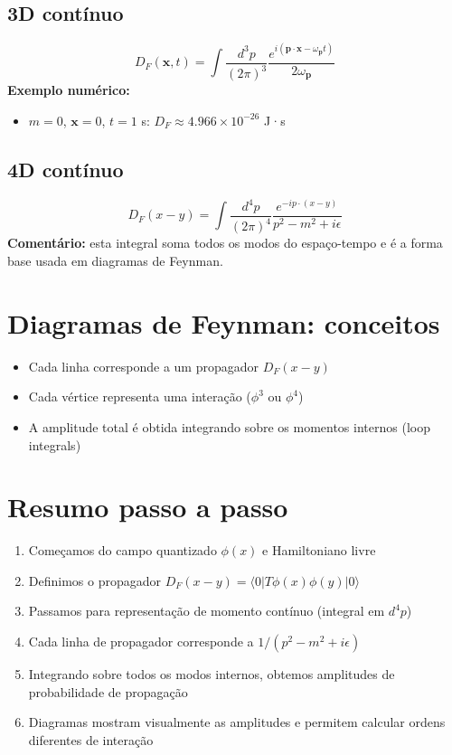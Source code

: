 \documentclass[12pt,a4paper]{article}
\begin{document}
\subsection{3D contínuo}
\begin{equation}
D_F(\mathbf{x},t) = \int \frac{d^3p}{(2\pi)^3} \frac{e^{i(\mathbf{p}\cdot\mathbf{x}-\omega_\mathbf{p} t)}}{2\omega_\mathbf{p}}
\end{equation}
\textbf{Exemplo numérico:}
\begin{itemize}
\item $m=0$, $\mathbf{x}=0$, $t=1$ s: $D_F \approx 4.966\times10^{-26}$ J·s
\end{itemize}

\subsection{4D contínuo}
\begin{equation}
D_F(x-y) = \int \frac{d^4p}{(2\pi)^4} \frac{e^{-i p\cdot (x-y)}}{p^2 - m^2 + i\epsilon}
\end{equation}
\textbf{Comentário:} esta integral soma todos os modos do espaço-tempo e é a forma base usada em diagramas de Feynman.

\section{Diagramas de Feynman: conceitos}
\begin{itemize}
\item Cada linha corresponde a um propagador $D_F(x-y)$
\item Cada vértice representa uma interação ($\phi^3$ ou $\phi^4$)
\item A amplitude total é obtida integrando sobre os momentos internos (loop integrals)
\end{itemize}

\section{Resumo passo a passo}
\begin{enumerate}
\item Começamos do campo quantizado $\phi(x)$ e Hamiltoniano livre
\item Definimos o propagador $D_F(x-y) = \langle0|T\phi(x)\phi(y)|0\rangle$
\item Passamos para representação de momento contínuo (integral em $d^4p$)
\item Cada linha de propagador corresponde a $1/(p^2 - m^2 + i\epsilon)$
\item Integrando sobre todos os modos internos, obtemos amplitudes de probabilidade de propagação
\item Diagramas mostram visualmente as amplitudes e permitem calcular ordens diferentes de interação
\end{enumerate}
\end{document}
